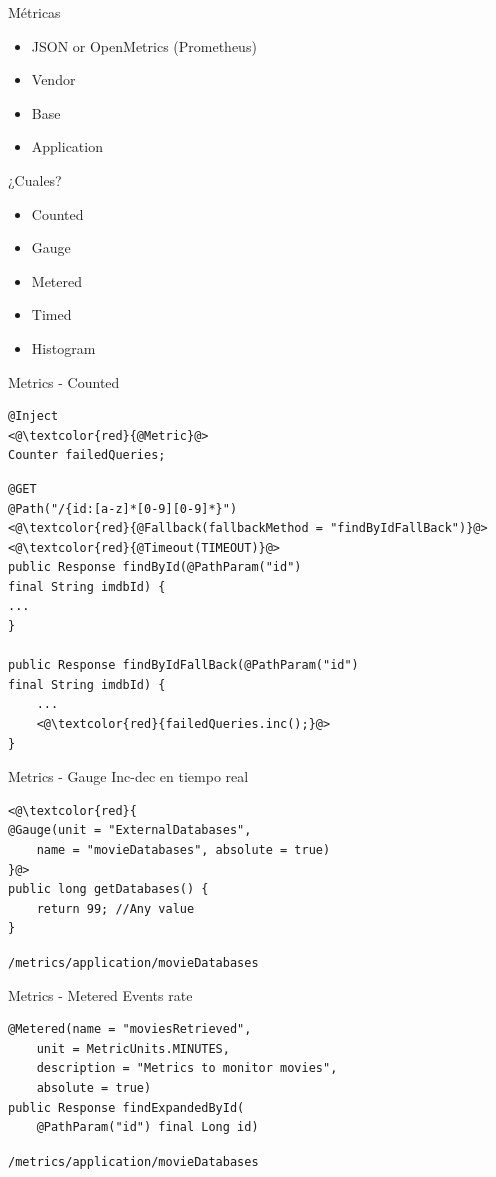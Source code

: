 \documentclass[aspectratio=169]{beamer}
\begin{document}
\begin{frame}{Métricas}

\begin{itemize}
	\item JSON or OpenMetrics (Prometheus)
	\item Vendor
	\item Base
	\item Application
\end{itemize}

¿Cuales?
\begin{itemize}
	\item Counted
	\item Gauge
	\item Metered
	\item Timed
	\item Histogram
\end{itemize}

\end{frame}

\begin{frame}[fragile]{Metrics - Counted}
\begin{lstlisting}
@Inject
<@\textcolor{red}{@Metric}@>
Counter failedQueries;
\end{lstlisting}

\begin{lstlisting}
@GET
@Path("/{id:[a-z]*[0-9][0-9]*}")
<@\textcolor{red}{@Fallback(fallbackMethod = "findByIdFallBack")}@>
<@\textcolor{red}{@Timeout(TIMEOUT)}@>
public Response findById(@PathParam("id")
final String imdbId) {
...
}

public Response findByIdFallBack(@PathParam("id")
final String imdbId) {
	...
	<@\textcolor{red}{failedQueries.inc();}@>
}
\end{lstlisting}
\end{frame}

\begin{frame}[fragile]{Metrics - Gauge}
Inc-dec en tiempo real
\begin{lstlisting}
<@\textcolor{red}{
@Gauge(unit = "ExternalDatabases",
	name = "movieDatabases", absolute = true)
}@>
public long getDatabases() {
	return 99; //Any value
}
\end{lstlisting}

\lstinline|/metrics/application/movieDatabases|
\end{frame}

\begin{frame}[fragile]{Metrics - Metered}
Events rate
\begin{lstlisting}
@Metered(name = "moviesRetrieved",
	unit = MetricUnits.MINUTES,
	description = "Metrics to monitor movies",
	absolute = true)
public Response findExpandedById(
	@PathParam("id") final Long id)
\end{lstlisting}

\lstinline|/metrics/application/movieDatabases|
\end{frame}
\end{document}
